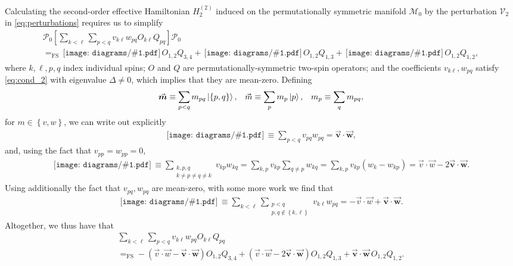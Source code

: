 \documentclass[nofootinbib,notitlepage,11pt]{revtex4-2}
\newcommand{\p}[1]{\left(#1\right)} %
\renewcommand{\sp}[1]{\left[#1\right]} %
\renewcommand{\set}[1]{\left\{#1\right\}} %
\renewcommand{\c}{\cdot} %
\newcommand{\m}{\bm} %
\renewcommand{\v}{\vec} %
\newcommand{\1}{\mathds{1}}
\newcommand{\M}{\mathcal{M}}
\renewcommand{\P}{\mathcal{P}}
\newcommand{\V}{\mathcal{V}}
\newcommand{\EQFS}{=_{\text{FS}}}
\newcommand{\diagram}[1]
{\,\texttt{[image: diagrams/\#1.pdf]}\,}
\begin{document}
Calculating the second-order effective Hamiltonian $H_2^{(2)}$ induced
on the permutationally symmetric manifold $\M_0$ by the perturbation
$\V_2$ in \eqref{eq:perturbations} requires us to simplify
\begin{multline}
  \P_0 \sp{\sum_{k<\ell} \sum_{p<q}
    v_{k\ell} w_{pq} O_{k\ell} Q_{pq}} \P_0 \\
  \EQFS \diagram{two_body_0} O_{1,2} Q_{3,4}
  + \diagram{two_body_1} O_{1,2} Q_{1,3}
  + \diagram{two_body_2} O_{1,2} Q_{1,2},
  \label{eq:POQP_start}
\end{multline}
where $k,\ell,p,q$ index individual spins; $O$ and $Q$ are
permutationally-symmetric two-spin operators; and the coefficients
$v_{k\ell},w_{pq}$ satisfy \eqref{eq:cond_2} with eigenvalue
$\Delta\ne0$, which implies that they are mean-zero.  Defining
\begin{align}
  \v{\m m} \equiv \sum_{p<q} m_{pq} \ket{\set{p,q}},
  &&
  \v m \equiv \sum_p m_p \ket{p},
  &&
  m_p \equiv \sum_q m_{pq},
\end{align}
for $m\in\set{v,w}$, we can write out explicitly
\begin{align}
  \diagram{two_body_2}
  \equiv \sum_{p<q} v_{pq} w_{pq} = \v{\m v} \c\v{\m w},
\end{align}
and, using the fact that $v_{pp}=w_{pp}=0$,
\begin{align}
  \diagram{two_body_1}
  \equiv \sum_{\substack{k,p,q\\k\ne p\ne q\ne k}} v_{kp} w_{kq}
  = \sum_{k,p} v_{kp} \sum_{q\ne p} w_{kq}
  = \sum_{k,p} v_{kp} \p{w_{k} - w_{kp}}
  = \v v \c \v w - 2 \v{\m v} \c \v{\m w}.
\end{align}
Using additionally the fact that $v_{pq},w_{pq}$ are mean-zero, with
some more work we find that
\begin{align}
  \diagram{two_body_0}
  \equiv \sum_{k<\ell} \sum_{\substack{p<q\\p,q\notin\set{k,\ell}}}
  v_{k\ell} w_{pq} = -\v v \c \v w + \v{\m v} \c \v{\m w}.
\end{align}
Altogether, we thus have that
\begin{multline}
  \sum_{k<\ell} \sum_{p<q} v_{k\ell} w_{pq} O_{k\ell} Q_{pq} \\
  \EQFS - \p{\v v \c \v w - \v{\m v} \c \v{\m w}} O_{1,2} Q_{3,4}
  + \p{\v v\c\v w - 2 \v{\m v} \c \v{\m w}} O_{1,2} Q_{1,3}
  + \v{\m v} \c \v{\m w}\, O_{1,2} Q_{1,2}.
  \label{eq:POQP}
\end{multline}

\end{document}
